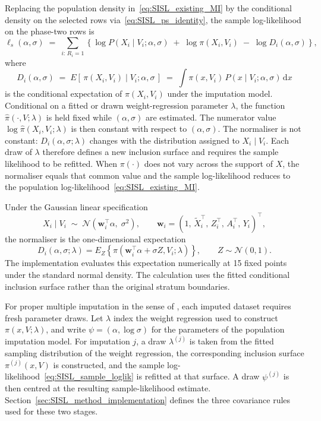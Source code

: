 Replacing the population density in~\eqref{eq:SISL_existing_MI} by the conditional density on the selected rows via~\eqref{eq:SISL_ps_identity}, the sample log-likelihood on the phase-two rows is
\begin{equation}
\ell_s(\alpha,\sigma)
\;=\;
\sum_{i:\,R_i = 1}
\left\{
\log P(X_i \mid V_i;\alpha,\sigma)
\;+\; \log \pi(X_i, V_i)
\;-\; \log D_i(\alpha,\sigma)
\right\},
\label{eq:SISL_sample_loglik}
\end{equation}
where
\begin{equation}
D_i(\alpha,\sigma)
\;=\;
E\!\left[\,\pi(X_i, V_i) \mid V_i;\alpha,\sigma\,\right]
\;=\;
\int \pi(x, V_i)\, P(x \mid V_i;\alpha,\sigma)\,\mathrm{d}x
\label{eq:SISL_denominator}
\end{equation}
is the conditional expectation of $\pi(X_i,V_i)$ under the imputation model. Conditional on a fitted or drawn weight-regression parameter $\lambda$, the function $\hat\pi(\cdot,V;\lambda)$ is held fixed while $(\alpha,\sigma)$ are estimated. The numerator value $\log\hat\pi(X_i,V_i;\lambda)$ is then constant with respect to $(\alpha,\sigma)$. The normaliser is not constant: $D_i(\alpha,\sigma;\lambda)$ changes with the distribution assigned to $X_i\mid V_i$. Each draw of $\lambda$ therefore defines a new inclusion surface and requires the sample likelihood to be refitted. When $\pi(\cdot)$ does not vary across the support of $X$, the normaliser equals that common value and the sample log-likelihood reduces to the population log-likelihood~\eqref{eq:SISL_existing_MI}.
 
Under the Gaussian linear specification
\begin{equation}
X_i \mid V_i
\;\sim\;
\mathcal{N}\!\left(\mathbf{w}_i^{\top}\alpha,\;\sigma^2\right),
\qquad
\mathbf{w}_i = (1,\, \tilde{X}_i^{\top},\, Z_i^{\top},\, A_i^{\top},\, Y_i)^{\top},
\label{eq:SISL_gaussian}
\end{equation}
the normaliser is the one-dimensional expectation
\[
D_i(\alpha,\sigma;\lambda)
=E_Z\!\left\{\pi(\mathbf w_i^\top\alpha+\sigma Z,V_i;\lambda)\right\},
\qquad Z\sim\mathcal N(0,1).
\]
The implementation evaluates this expectation numerically at 15 fixed points under the standard normal density. The calculation uses the fitted conditional inclusion surface rather than the original stratum boundaries.
 
For proper multiple imputation in the sense of \citet{Rubin1987}, each imputed dataset requires fresh parameter draws. Let $\lambda$ index the weight regression used to construct $\pi(x,V;\lambda)$, and write $\psi=(\alpha,\log\sigma)$ for the parameters of the population imputation model. For imputation $j$, a draw $\lambda^{(j)}$ is taken from the fitted sampling distribution of the weight regression, the corresponding inclusion surface $\pi^{(j)}(x,V)$ is constructed, and the sample log-likelihood~\eqref{eq:SISL_sample_loglik} is refitted at that surface. A draw $\psi^{(j)}$ is then centred at the resulting sample-likelihood estimate. Section~\ref{sec:SISL_method_implementation} defines the three covariance rules used for these two stages.
 
